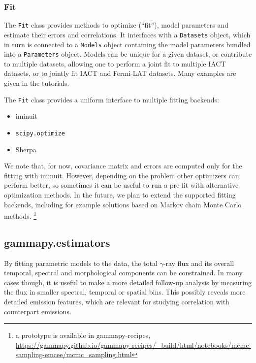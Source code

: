 \documentclass[longauth]{aa}
\newcommand{\code}[1]{\texttt{#1}}
\newcommand{\iminuit}{iminuit\xspace}
\newcommand{\sherpa}{Sherpa\xspace}
\newcommand{\fermi}{Fermi-LAT\xspace}
\newcommand{\gammaray}{$\gamma$-ray\xspace}
\begin{document}
\subsubsection{Fit}
\label{sssec:fit}


The \code{Fit} class provides methods to optimize (\enquote{fit}), model parameters and estimate
their errors and correlations. It interfaces with a \code{Datasets} object, which
in turn is connected to a \code{Models} object containing the model parameters bundled into a
\code{Parameters} object. Models can be unique for a given dataset, or contribute to
multiple datasets, allowing one to perform a joint fit to
multiple IACT datasets, or to jointly fit IACT and \fermi datasets. Many
examples are given in the tutorials.

The \code{Fit} class provides a uniform interface to multiple fitting backends:
\begin{itemize}
        \setlength\itemsep{1em}
        \item \iminuit~\citep{iminuit}
        \item \code{scipy.optimize}~\citep{2020SciPy-NMeth}
        \item \sherpa~\citep{sherpa-2011, sherpa-2001}
\end{itemize}

We note that, for now, covariance matrix and errors are computed only for the fitting with 
\iminuit. However, depending on
the problem other optimizers can perform better, so sometimes it can be useful
to run a pre-fit with alternative optimization methods. In the future, we plan to
extend the supported fitting backends, including for example solutions based on Markov chain Monte Carlo methods.
\footnote{a prototype is available in gammapy-recipes,
        \url{https://gammapy.github.io/gammapy-recipes/_build/html/notebooks/mcmc-sampling-emcee/mcmc_sampling.html}
}

\subsection{gammapy.estimators}
\label{ssec:gammapy-estimators}
By fitting parametric models to the data, the total \gammaray
flux and its overall temporal, spectral and morphological components can be constrained.
In many cases though, it is useful to make a more detailed follow-up analysis by measuring the
flux in smaller spectral, temporal or spatial bins. This
possibly reveals more detailed emission features, which
are relevant for studying correlation with counterpart emissions.
\end{document}
